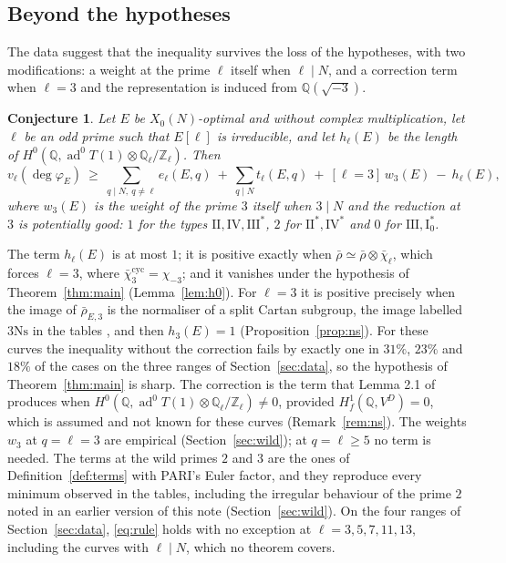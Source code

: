 \documentclass[11pt]{amsart}
\newtheorem{conjecture}[theorem]{Conjecture}
\theoremstyle{definition}
\newcommand{\Q}{\mathbb{Q}}
\newcommand{\Z}{\mathbb{Z}}
\newcommand{\degphi}{\deg\varphi_E}
\newcommand{\ad}{\operatorname{ad}^0}
\newcommand{\Ns}{3\mathrm{Ns}}
\newcommand{\cyc}{\mathrm{cyc}}
\begin{document}
\subsection{Beyond the hypotheses}
The data suggest that the inequality survives the loss of the hypotheses, with two modifications: a weight at the prime $\ell$ itself when $\ell\mid N$, and a correction term when $\ell=3$ and the representation is induced from $\Q(\sqrt{-3})$.

\begin{conjecture}\label{conj:euler}
Let $E$ be $X_0(N)$-optimal and without complex multiplication, let $\ell$ be an odd prime such that $E[\ell]$ is irreducible, and let $h_\ell(E)$ be the length of $H^0(\Q,\ad T(1)\otimes\Q_\ell/\Z_\ell)$. Then
\begin{equation}\label{eq:rule}
v_\ell(\degphi)\ \ge\ \sum_{q\mid N,\ q\ne\ell}e_\ell(E,q)\ +\ \sum_{q\mid N}t_\ell(E,q)\ +\ [\ell=3]\,w_3(E)\ -\ h_\ell(E),
\end{equation}
where $w_3(E)$ is the weight of the prime $3$ itself when $3\mid N$ and the reduction at $3$ is potentially good: $1$ for the types $\mathrm{II},\mathrm{IV},\mathrm{III}^*$, $2$ for $\mathrm{II}^*,\mathrm{IV}^*$ and $0$ for $\mathrm{III},\mathrm{I}_0^*$.
\end{conjecture}

The term $h_\ell(E)$ is at most $1$; it is positive exactly when $\bar\rho\simeq\bar\rho\otimes\bar\chi_\ell$, which forces $\ell=3$, where $\bar\chi_3^{\cyc}=\chi_{-3}$; and it vanishes under the hypothesis of Theorem~\ref{thm:main} (Lemma~\ref{lem:h0}). For $\ell=3$ it is positive precisely when the image of $\bar\rho_{E,3}$ is the normaliser of a split Cartan subgroup, the image labelled $\Ns$ in the tables \cite{Sutherland16}, and then $h_3(E)=1$ (Proposition~\ref{prop:ns}). For these curves the inequality without the correction fails by exactly one in $31\%$, $23\%$ and $18\%$ of the cases on the three ranges of Section~\ref{sec:data}, so the hypothesis of Theorem~\ref{thm:main} is sharp. The correction is the term that Lemma 2.1 of \cite{DFG04} produces when $H^0(\Q,\ad T(1)\otimes\Q_\ell/\Z_\ell)\ne0$, provided $H^1_f(\Q,V^D)=0$, which is assumed and not known for these curves (Remark~\ref{rem:ns}). The weights $w_3$ at $q=\ell=3$ are empirical (Section~\ref{sec:wild}); at $q=\ell\ge5$ no term is needed. The terms at the wild primes $2$ and $3$ are the ones of Definition~\ref{def:terms} with PARI's Euler factor, and they reproduce every minimum observed in the tables, including the irregular behaviour of the prime $2$ noted in an earlier version of this note (Section~\ref{sec:wild}). On the four ranges of Section~\ref{sec:data}, \eqref{eq:rule} holds with no exception at $\ell=3,5,7,11,13$, including the curves with $\ell\mid N$, which no theorem covers.
\end{document}
